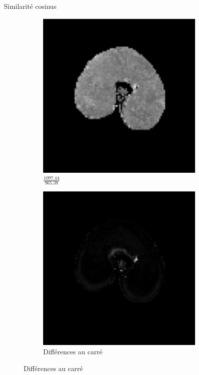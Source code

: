 \documentclass[10pt]{beamer}
\begin{document}
\begin{frame}{Similarité cosinus}
{\begin{figure}[ht]
\begin{subfigure}[t]{0.33\textwidth}
        \includegraphics[width=0.9\textwidth]{fig/cosine_msi}%
        \caption{$\frac{1097.44}{965.38}$}
        \label{subfig:cosine_msi}
      \end{subfigure}%
      \begin{subfigure}[t]{0.33\textwidth}
        \centering
        \includegraphics[width=0.9\textwidth]{fig/cosine_diff}%
        \caption{Différences au carré}
      \end{subfigure}%
    \end{figure}
  }
  

\end{frame}
\end{document}
